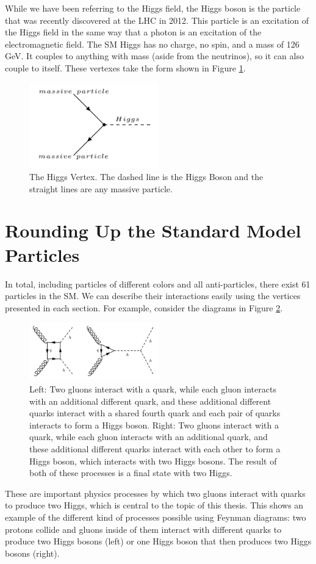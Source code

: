 While we have been referring to the Higgs field, the Higgs boson is the particle that was recently discovered at the LHC in 2012. This particle is an excitation of the Higgs field in the same way that a photon is an excitation of the electromagnetic field. The SM Higgs has no charge, no spin, and a mass of 126 GeV. It couples to anything with mass (aside from the neutrinos), so it can also couple to itself. These vertexes take the form shown in Figure \ref{Fig:Intro:Vertex4}.
\begin{figure}[h]
    \centering
        \includegraphics[width=0.5\textwidth]{F1/Vertex4}
        \caption{The Higgs Vertex. The dashed line is the Higgs Boson and the straight lines are any massive particle.}
        \label{Fig:Intro:Vertex4}
\end{figure}

\section{Rounding Up the Standard Model Particles}
In total, including particles of different colors and all anti-particles, there exist 61 particles in the SM. We can describe their interactions easily using the vertices presented in each section. For example, consider the diagrams in Figure \ref{Fig:Intro:hh}.
\begin{figure}[h]
    \centering
        \includegraphics[width=0.5\textwidth]{F1/dihiggs}
        \caption{Left: Two gluons interact with a quark, while each gluon interacts with an additional different quark, and these additional different quarks interact with a shared fourth quark and each pair of quarks interacts to form a Higgs boson. Right: Two gluons interact with a quark, while each gluon interacts with an additional quark, and these additional different quarks interact with each other to form a Higgs boson, which interacts with two Higgs bosons. The result of both of these processes is a final state with two Higgs.}
        \label{Fig:Intro:hh}
\end{figure}
These are important physics processes by which two gluons interact with quarks to produce two Higgs, which is central to the topic of this thesis. This shows an example of the different kind of processes possible using Feynman diagrams: two protons collide and gluons inside of them interact with different quarks to produce two Higgs bosons (left) or one Higgs boson that then produces two Higgs bosons (right).

